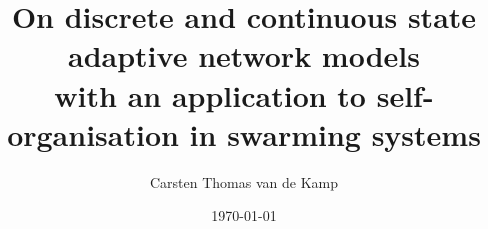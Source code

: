 \documentclass[11pt, a4paper, twoside]{memoir}
\begin{document}
	

	


\title{On discrete and continuous state adaptive network models\\
	\vspace{0.3cm}\Large with an application to self-organisation in swarming systems}
\author{Carsten Thomas van de Kamp}
\date{\today}


\frontmatter		%



\pagestyle{plain}	%

\cleardoublepage

\cleardoublepage
\begin{KeepFromToc}
	\tableofcontents
\end{KeepFromToc}

\cleardoublepage

\mainmatter			%
\pagestyle{carsten}









\appendix			%

\renewcommand\bibname{References}
\printbibliography
\end{document}
